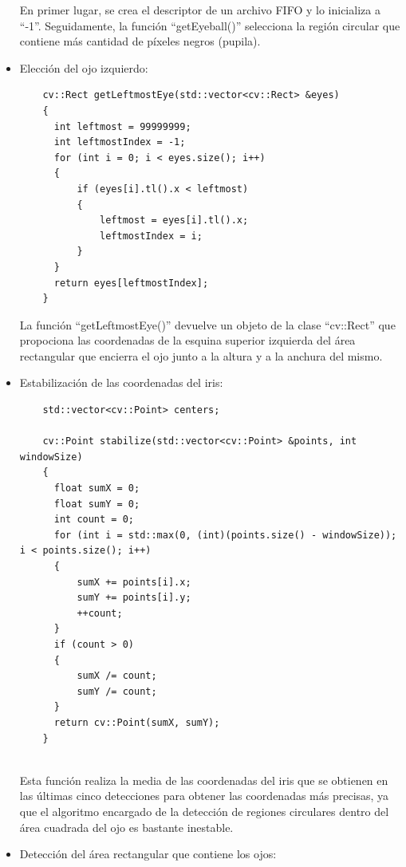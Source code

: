 \begin{itemize}
    En primer lugar, se crea el descriptor de un archivo FIFO y lo inicializa a ``-1''. Seguidamente, la función ``getEyeball()'' selecciona la región circular que contiene más cantidad de píxeles negros (pupila).
    
    \item Elección del ojo izquierdo: \\
    
    \begin{verbatim}
    cv::Rect getLeftmostEye(std::vector<cv::Rect> &eyes)
    {
      int leftmost = 99999999;
      int leftmostIndex = -1;
      for (int i = 0; i < eyes.size(); i++)
      {
          if (eyes[i].tl().x < leftmost)
          {
              leftmost = eyes[i].tl().x;
              leftmostIndex = i;
          }
      }
      return eyes[leftmostIndex];
    }
    \end{verbatim}
    
La función ``getLeftmostEye()'' devuelve un objeto de la clase ``cv::Rect'' que propociona las coordenadas de la esquina superior izquierda del área rectangular que encierra el ojo junto a la altura y a la anchura del mismo.

    \item Estabilización de las coordenadas del iris: \\
    
    \begin{verbatim}
    std::vector<cv::Point> centers;
    
    cv::Point stabilize(std::vector<cv::Point> &points, int windowSize)
    {
      float sumX = 0;
      float sumY = 0;
      int count = 0;
      for (int i = std::max(0, (int)(points.size() - windowSize)); i < points.size(); i++)
      {
          sumX += points[i].x;
          sumY += points[i].y;
          ++count;
      }
      if (count > 0)
      {
          sumX /= count;
          sumY /= count;
      }
      return cv::Point(sumX, sumY);
    }
    
    \end{verbatim}
    
Esta función realiza la media de las coordenadas del iris que se obtienen en las últimas cinco detecciones para obtener las coordenadas más precisas, ya que el algoritmo encargado de la detección de regiones circulares dentro del área cuadrada del ojo es bastante inestable.

    \item Detección del área rectangular que contiene los ojos: \\
    

\end{itemize}
